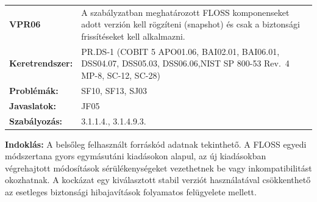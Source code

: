 \documentclass[12pt,magyar,a4paper,oneside]{scrreprt}
\begin{document}
\begin{longtable}[]{@{}ll@{}}
\toprule
\endhead
\begin{minipage}[t]{0.16\columnwidth}\raggedright
\textbf{VPR06}\strut
\end{minipage} & \begin{minipage}[t]{0.79\columnwidth}\raggedright
A szabályzatban meghatározott FLOSS komponenseket adott verzión kell
rögzíteni (snapshot) és csak a biztonsági frissítéseket kell
alkalmazni.\strut
\end{minipage}\tabularnewline
\begin{minipage}[t]{0.16\columnwidth}\raggedright
\textbf{Keretrendszer:}\strut
\end{minipage} & \begin{minipage}[t]{0.79\columnwidth}\raggedright
PR.DS-1 (COBIT 5 APO01.06, BAI02.01, BAI06.01, DSS04.07, DSS05.03,
DSS06.06,NIST SP 800-53 Rev.~4 MP-8, SC-12, SC-28)\strut
\end{minipage}\tabularnewline
\begin{minipage}[t]{0.16\columnwidth}\raggedright
\textbf{Problémák:}\strut
\end{minipage} & \begin{minipage}[t]{0.79\columnwidth}\raggedright
SF10, SF13, SJ03\strut
\end{minipage}\tabularnewline
\begin{minipage}[t]{0.16\columnwidth}\raggedright
\textbf{Javaslatok:}\strut
\end{minipage} & \begin{minipage}[t]{0.79\columnwidth}\raggedright
JF05\strut
\end{minipage}\tabularnewline
\begin{minipage}[t]{0.16\columnwidth}\raggedright
\textbf{Szabályozás:}\strut
\end{minipage} & \begin{minipage}[t]{0.79\columnwidth}\raggedright
3.1.1.4., 3.1.4.9.3.\strut
\end{minipage}\tabularnewline
\bottomrule
\end{longtable}

\textbf{Indoklás: } A belsőleg felhasznált forráskód adatnak tekinthető.
A FLOSS egyedi módszertana gyors egymásutáni kiadásokon alapul, az új
kiadásokban végrehajtott módosítások sérülékenységeket vezethetnek be
vagy inkompatibilitást okozhatnak. A kockázat egy kiválasztott stabil
verziót használatával csökkenthető az esetleges biztonsági hibajavítások
folyamatos felügyelete mellett.
\end{document}
